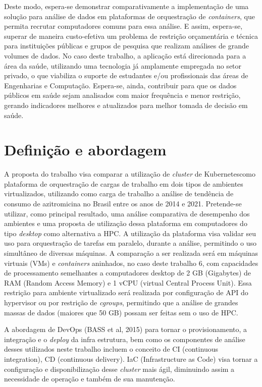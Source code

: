 Deste modo, espera-se demonstrar comparativamente a implementação de uma solução para análise de dados em plataformas de orquestração de \emph{containers}, que permita recrutar computadores comuns para essa análise. E assim, espera-se, superar de maneira custo-efetiva um problema de restrição orçamentária e técnica para instituições públicas e grupos de pesquisa que realizam análises de grande volumes de dados. No caso deste trabalho, a aplicação está direcionada para a área da saúde, utilizando uma tecnologia já amplamente empregada no setor privado, o que viabiliza o suporte de estudantes e/ou profissionais das áreas de Engenharias e Computação. Espera-se, ainda, contribuir para que os dados públicos em saúde sejam analisados com  maior frequência e menor restrição, gerando indicadores melhores e atualizados para melhor tomada de decisão em saúde.

\section{Definição e abordagem}
\label{sec:abordagem}

A proposta do trabalho visa comparar a utilização de \emph{cluster} de Kubernetes\textregistered como plataforma de orquestração de cargas de trabalho em dois tipos de ambientes virtualizados, utilizando como carga de trabalho a análise de tendência de consumo de azitromicina no Brasil entre os anos de 2014 e 2021. Pretende-se utilizar, como principal resultado, uma análise comparativa de desempenho dos ambientes e uma proposta de utilização dessa plataforma em computadores do tipo \emph{desktop} como alternativa a HPC.
A utilização da plataforma visa validar seu uso para orquestração de tarefas em paralelo, durante a análise, permitindo o uso simultâneo de diversas máquinas. A comparação a ser realizada será em máquinas virtuais (VMs) e \emph{containers} aninhados, no caso deste trabalho 6, com capacidades de processamento semelhantes a computadores desktop de 2 GB (Gigabytes) de RAM (Random Access Memory) e 1 vCPU (virtual Central Process Unit). Essa restrição para ambiente virtualizado será realizada por configuração de API do hypervisor ou por restrição de \emph{cgroups}, permitindo que a análise de grandes massas de dados (maiores que 50 GB) possam ser feitas sem o uso de HPC.

A abordagem de DevOps (BASS et al, 2015) para tornar o provisionamento, a integração e o \emph{deploy} da infra estrutura, bem como os componentes de análise desses utilizados neste trabalho incluem o conceito de CI (continuous integration), CD (continuous delivery).  IaC (Infrastructure as Code) visa tornar a configuração e disponibilização desse \emph{cluster} mais ágil, diminuindo assim a necessidade de operação e também de sua manutenção.

